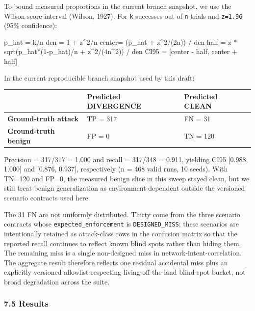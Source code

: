 \documentclass[
]{article}
\newenvironment{Shaded}{}{}
\newcommand{\NormalTok}[1]{#1}
\newcounter{none} %
\begin{document}
To bound measured proportions in the current branch snapshot, we use the
Wilson score interval (Wilson, 1927). For \texttt{k} successes out of
\texttt{n} trials and \texttt{z=1.96} (95\% confidence):

\begin{Shaded}
\begin{Highlighting}[]
\NormalTok{p\_hat = k/n}
\NormalTok{den   = 1 + z\^{}2/n}
\NormalTok{center= (p\_hat + z\^{}2/(2n)) / den}
\NormalTok{half  = z * sqrt(p\_hat*(1{-}p\_hat)/n + z\^{}2/(4n\^{}2)) / den}
\NormalTok{CI95  = [center {-} half, center + half]}
\end{Highlighting}
\end{Shaded}

In the current reproducible branch snapshot used by this draft:

{\def\LTcaptype{none} %
\begin{longtable}[]{@{}lll@{}}
\toprule\noalign{}
& Predicted DIVERGENCE & Predicted CLEAN \\
\midrule\noalign{}
\endhead
\bottomrule\noalign{}
\endlastfoot
\textbf{Ground-truth attack} & TP = 317 & FN = 31 \\
\textbf{Ground-truth benign} & FP = 0 & TN = 120 \\
\end{longtable}
}

Precision = 317/317 = 1.000 and recall = 317/348 = 0.911, yielding CI95
{[}0.988, 1.000{]} and {[}0.876, 0.937{]}, respectively (n = 468 valid
runs, 10 seeds). With TN=120 and FP=0, the measured benign slice in this
sweep stayed clean, but we still treat benign generalization as
environment-dependent outside the versioned scenario contracts used
here.

The 31 FN are not uniformly distributed. Thirty come from the three
scenario contracts whose \texttt{expected\_enforcement} is
\texttt{DESIGNED\_MISS}; these scenarios are intentionally retained as
attack-class rows in the confusion matrix so that the reported recall
continues to reflect known blind spots rather than hiding them. The
remaining miss is a single non-designed miss in
network-intent-correlation. The aggregate result therefore reflects one
residual accidental miss plus an explicitly versioned
allowlist-respecting living-off-the-land blind-spot bucket, not broad
degradation across the suite.

\subsubsection{7.5 Results}\label{results}
\end{document}
